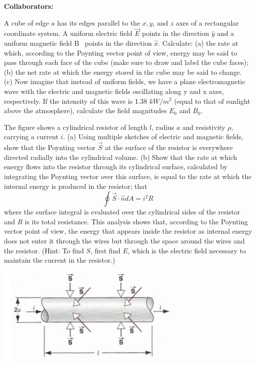 \documentclass[11pt,letterpaper,boxed]{hmcpset}
\begin{document}
	
	\noindent\textbf{Collaborators:} 
	
	
	\begin{problem}

A cube of edge $a$ has its edges parallel to the $x, y$, and $z$ axes of a rectangular coordinate system.
A uniform electric field $\vec{E}$ points in the direction $\hat{y}$ and a uniform magnetic field B~ points in the direction $\hat{x}$. Calculate:
(a) the rate at which, according to the Poynting vector point of view, energy may be said to pass
through each face of the cube (make sure to draw and label the cube faces);
(b) the net rate at which the energy stored in the cube may be said to change.
(c) Now imagine that instead of uniform fields, we have a plane electromagnetic wave with the
electric and magnetic fields oscillating along y and x axes, respectively. If the intensity of this wave is 1.38 $kW/m^2$ (equal to that of sunlight above the atmosphere), calculate the field magnitudes $E_0$
and $B_0$.
\end{problem}
\vfill

\begin{solution}
\end{solution}
\vfill
\newpage

\begin{problem}
The figure shows a cylindrical resistor of length $l$, radius $a$ and resistivity $\rho$, carrying a current $i$.
(a) Using multiple sketches of electric and magnetic fields, show that the Poynting vector $\vec{S}$ at the surface of the resistor is everywhere directed radially into the cylindrical volume.
(b) Show that the rate at which energy flows into the resistor through its cylindrical surface, calculated by integrating the Poynting vector over this surface, is equal to the rate at which the internal energy is produced in the resistor; that
$$\oint \vec{S} \cdot \hat{n} dA = i^2 R$$
where the surface integral is evaluated over the cylindrical sides of the resistor and $R$ is its total resistance.
This analysis shows that, according to the Poynting vector point of view, the energy that
appears inside the resistor as internal energy does not enter it through the wires but through the space around the wires and the resistor. (Hint: To find $S$, first find $E$, which is the electric field
necessary to maintain the current in the resistor.)\\
\begin{center}
\includegraphics[scale=.8]{51m12pic.jpg}
\end{center}
\end{problem}

\vfill

\begin{solution}
\end{solution}
\end{document}
